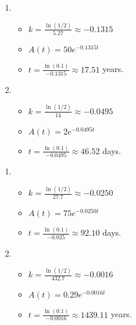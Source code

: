 \begin{multicols}{2}
\begin{enumerate}
\setcounter{enumi}{\value{HW}}
\addtocounter{enumi}{1}

\item  \begin{itemize}  \item $k = \frac{\ln(1/2)}{5.27} \approx -0.1315$

\item $A(t) = 50e^{-0.1315t}$

\item  $t = \frac{\ln(0.1)}{-0.1315} \approx 17.51$ years.

\end{itemize}



\item  \begin{itemize}  \item $k = \frac{\ln(1/2)}{14} \approx -0.0495$

\item $A(t) = 2e^{-0.0495t}$

\item  $t = \frac{\ln(0.1)}{-0.0495} \approx 46.52$ days.

\end{itemize}

\setcounter{HW}{\value{enumi}}
\end{enumerate}
\end{multicols}

\begin{multicols}{2}
\begin{enumerate}
\setcounter{enumi}{\value{HW}}


\item  \begin{itemize}  \item $k = \frac{\ln(1/2)}{27.7} \approx -0.0250$

\item $A(t) = 75e^{-0.0250t}$

\item  $t = \frac{\ln(0.1)}{-0.025} \approx 92.10$ days.

\end{itemize}

\item  \begin{itemize}  \item $k = \frac{\ln(1/2)}{432.7} \approx -0.0016$

\item $A(t) = 0.29e^{-0.0016t}$

\item  $t = \frac{\ln(0.1)}{-0.0016} \approx 1439.11$ years.

\end{itemize}


\setcounter{HW}{\value{enumi}}
\end{enumerate}
\end{multicols}

